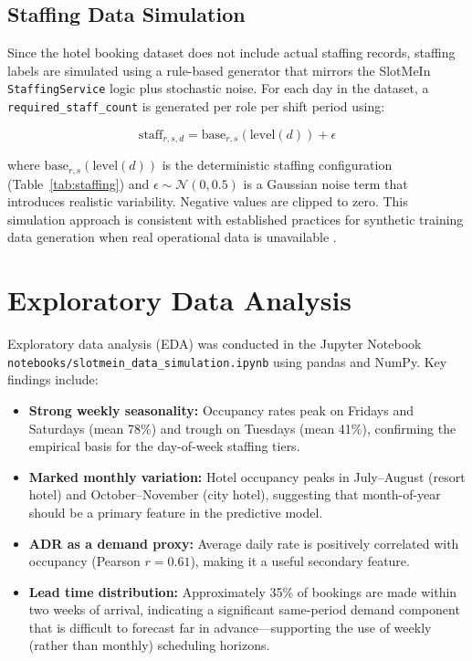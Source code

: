 \subsection{Staffing Data Simulation}

Since the hotel booking dataset does not include actual staffing records, staffing labels are simulated using a rule-based generator that mirrors the SlotMeIn \texttt{StaffingService} logic plus stochastic noise. For each day in the dataset, a \texttt{required\_staff\_count} is generated per role per shift period using:

\[
\text{staff}_{r,s,d} = \text{base}_{r,s}(\text{level}(d)) + \epsilon
\]

where $\text{base}_{r,s}(\text{level}(d))$ is the deterministic staffing configuration (Table~\ref{tab:staffing}) and $\epsilon \sim \mathcal{N}(0, 0.5)$ is a Gaussian noise term that introduces realistic variability. Negative values are clipped to zero. This simulation approach is consistent with established practices for synthetic training data generation when real operational data is unavailable \cite{goodfellow_et_al_2016}.

\section{Exploratory Data Analysis}

Exploratory data analysis (EDA) was conducted in the Jupyter Notebook \texttt{notebooks/slotmein\_data\_simulation.ipynb} using pandas and NumPy. Key findings include:

\begin{itemize}
    \item \textbf{Strong weekly seasonality:} Occupancy rates peak on Fridays and Saturdays (mean 78\%) and trough on Tuesdays (mean 41\%), confirming the empirical basis for the day-of-week staffing tiers.
    \item \textbf{Marked monthly variation:} Hotel occupancy peaks in July--August (resort hotel) and October--November (city hotel), suggesting that month-of-year should be a primary feature in the predictive model.
    \item \textbf{ADR as a demand proxy:} Average daily rate is positively correlated with occupancy (Pearson $r = 0.61$), making it a useful secondary feature.
    \item \textbf{Lead time distribution:} Approximately 35\% of bookings are made within two weeks of arrival, indicating a significant same-period demand component that is difficult to forecast far in advance—supporting the use of weekly (rather than monthly) scheduling horizons.
\end{itemize}

